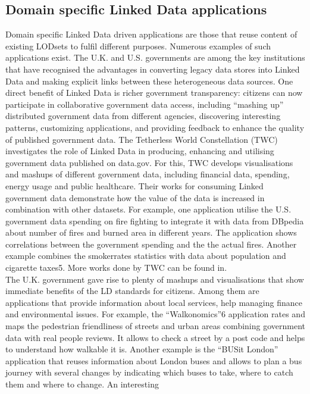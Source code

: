 \documentclass[a4paper,12pt,oneside]{report}
\begin{document}
{{{\subsection{Domain specific Linked Data applications}
{Domain specific Linked Data driven applications are those that reuse content of existing LODsets to fulfil different purposes. Numerous examples of such applications exist. The U.K. and U.S. governments are among the key institutions that have recognised the advantages in converting legacy data stores into Linked Data and making explicit links between these heterogeneous data sources. One direct benefit of Linked Data is richer government transparency: citizens can now participate in collaborative
government data access, including “mashing up” distributed government data from different agencies, discovering interesting patterns, customizing applications, and providing feedback to enhance the quality of published government data. The Tetherless
World Constellation (TWC)  investigates the role of Linked Data in producing, enhancing and utilising government data published on data.gov. For this, TWC develops visualisations and mashups of different government data, including financial data,
spending, energy usage and public healthcare. Their works for consuming Linked government data demonstrate how the value of the data is increased in combination with other datasets. For example, one application utilise the U.S. government data spending on fire fighting to integrate it with data from DBpedia about number of fires and burned area in different years. The application shows correlations between the government spending and the the actual fires. Another example combines the smokerrates statistics with data about population and cigarette taxes5. More works done by TWC can be found in.\\
The U.K. government gave rise to plenty of mashups and visualisations that show immediate benefits of the LD standards for citizens. Among them are applications that provide information about local services, help managing finance and environmental issues. For example, the “Walkonomics”6 application rates and maps the pedestrian friendliness of streets and urban areas combining government data with real people reviews. It allows to check a street by a post code and helps to understand how walkable it is. Another example is the “BUSit London” application that reuses information about London buses and allows to plan a bus journey with several changes by indicating which buses to take, where to catch them and where to change. An interesting
}}}}
\end{document}
